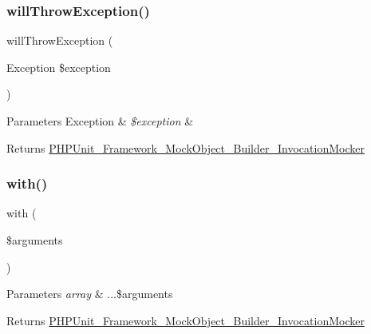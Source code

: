 \subsubsection{\texorpdfstring{will\+Throw\+Exception()}{willThrowException()}}
{\footnotesize\ttfamily will\+Throw\+Exception (\begin{DoxyParamCaption}\item[{Exception}]{\$exception }\end{DoxyParamCaption})}


\begin{DoxyParams}[1]{Parameters}
Exception & {\em \$exception} & \\
\hline
\end{DoxyParams}
\begin{DoxyReturn}{Returns}
\mbox{\hyperlink{class_p_h_p_unit___framework___mock_object___builder___invocation_mocker}{P\+H\+P\+Unit\+\_\+\+Framework\+\_\+\+Mock\+Object\+\_\+\+Builder\+\_\+\+Invocation\+Mocker}} 
\end{DoxyReturn}
\mbox{\label{class_p_h_p_unit___framework___mock_object___builder___invocation_mocker_a9197873aa58b8efb8b5570613a05632b}} 
\subsubsection{\texorpdfstring{with()}{with()}}
{\footnotesize\ttfamily with (\begin{DoxyParamCaption}\item[{}]{\$arguments }\end{DoxyParamCaption})}


\begin{DoxyParams}{Parameters}
{\em array} & ...\$arguments\\
\hline
\end{DoxyParams}
\begin{DoxyReturn}{Returns}
\mbox{\hyperlink{class_p_h_p_unit___framework___mock_object___builder___invocation_mocker}{P\+H\+P\+Unit\+\_\+\+Framework\+\_\+\+Mock\+Object\+\_\+\+Builder\+\_\+\+Invocation\+Mocker}} 
\end{DoxyReturn}



